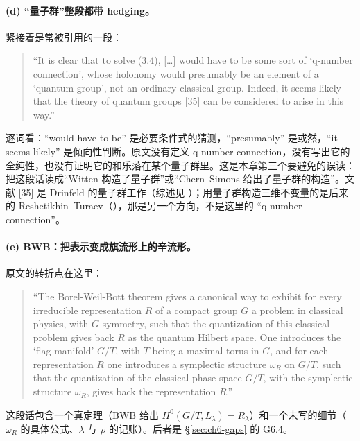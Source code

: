 \paragraph{(d) “量子群”整段都带 hedging。}紧接着是常被引用的一段：
\begin{quote}\small
“It is clear that to solve (3.4), [\dots] would have to be some sort of `q-number connection', whose holonomy would presumably be an element of a `quantum group', not an ordinary classical group. Indeed, it seems likely that the theory of quantum groups [35] can be considered to arise in this way.” 
\end{quote}
逐词看：“would have to be” 是必要条件式的猜测，“presumably” 是或然，“it seems likely” 是倾向性判断。原文没有定义 q-number connection，没有写出它的全纯性，也没有证明它的和乐落在某个量子群里。这是本章第三个要避免的误读：把这段话读成“Witten 构造了量子群”或“Chern--Simons 给出了量子群的构造”。文献 [35] 是 Drinfeld 的量子群工作（综述见 \cite{drinfeld1986}）；用量子群构造三维不变量的是后来的 Reshetikhin--Turaev（\cite{rt1991}），那是另一个方向，不是这里的 “q-number connection”。

\paragraph{(e) BWB：把表示变成旗流形上的辛流形。}原文的转折点在这里：
\begin{quote}\small
“The Borel-Weil-Bott theorem gives a canonical way to exhibit for every irreducible representation $R$ of a compact group $G$ a problem in classical physics, with $G$ symmetry, such that the quantization of this classical problem gives back $R$ as the quantum Hilbert space. One introduces the `flag manifold' $G/T$, with $T$ being a maximal torus in $G$, and for each representation $R$ one introduces a symplectic structure $\omega_R$ on $G/T$, such that the quantization of the classical phase space $G/T$, with the symplectic structure $\omega_R$, gives back the representation $R$.” 
\end{quote}
这段话包含一个真定理（BWB 给出 $H^0(G/T,L_\lambda)=R_\lambda$）和一个未写的细节（$\omega_R$ 的具体公式、$\lambda$ 与 $\rho$ 的记账）。后者是 \S\ref{sec:ch6-gaps} 的 G6.4。

